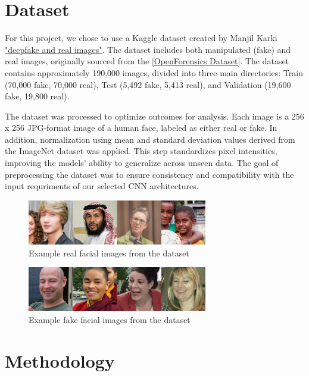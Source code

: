 \documentclass[conference]{IEEEtran}
\begin{document}
\section*{Dataset}
For this project, we chose to use a Kaggle dataset created by Manjil Karki \href{https://www.kaggle.com/datasets/manjilkarki/deepfake-and-real-images}{"deepfake and real images"}. The dataset includes both manipulated (fake) and real images, originally sourced from the \href{https://sites.google.com/view/ltnghia/research/openforensics}{[OpenForensics Dataset]}. The dataset contains approximately 190,000 images, divided into three main directories: Train (70,000 fake, 70,000 real), Test (5,492 fake, 5,413 real), and Validation (19,600 fake, 19,800 real).

The dataset was processed to optimize outcomes for analysis. Each image is a 256 x 256 JPG-format image of a human face, labeled as either real or fake. In addition,  normalization using mean and standard deviation values derived from the ImageNet dataset was applied. This step standardizes pixel intensities, improving the models' ability to generalize across unseen data. The goal of preprocessing the dataset was to ensure consistency and compatibility with the input requriments of our selected CNN architectures.

\begin{figure}[ht]
\centering
\includegraphics[width=0.7\textwidth]{reall.png}
\caption{Example real facial images from the dataset}
\label{reall}
\end{figure} 
\begin{figure}[ht]
\centering
\includegraphics[width=0.7\textwidth]{fakee.png}
\caption{Example fake facial images from the dataset}
\label{fakee}
\end{figure} 


\section*{Methodology}
\end{document}
